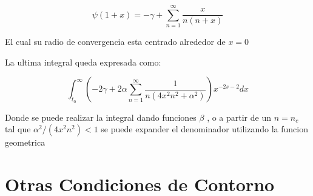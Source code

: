 \begin{equation}
\psi (1+x) = - \gamma + \sum _{n=1} ^{\infty} \frac{x}{n(n+x)}
\end{equation}

El cual su radio de convergencia esta centrado alrededor de $x = 0$

La ultima integral queda expresada como:

\begin{equation}
\int _{t_0} ^{\infty} 
\left(
-2 \gamma + 2 \alpha \sum _{n=1} ^{\infty} \frac{1}{n(4 x^2 n^2+\alpha ^2)}
\right)
x ^{-2s-2} dx
\end{equation}

Donde se puede realizar la integral dando funciones $\beta$ , o a partir de un $n = n_c$ tal que $\alpha ^2 /(4 x^2 n^2) < 1$ se puede expander el denominador utilizando la funcion geometrica

\section{Otras Condiciones de Contorno}





